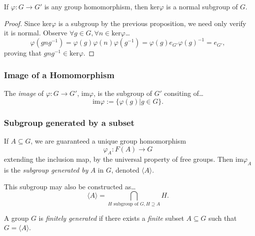 \begin{lemma}
If $\varphi: G \rightarrow G'$ is any group homomorphism, then ker$\varphi$ is a normal subgroup of $G$.
\end{lemma}

\begin{proof}
Since ker$\varphi$ is a subgroup by the previous proposition, we need only verify it is normal. Observe $\forall g \in G, \forall n \in \textrm{ker}\varphi$\dots
$$\varphi(gng^{-1}) = \varphi(g)\varphi(n)\varphi(g^{-1}) = \varphi(g)e_{G'}\varphi(g)^{-1} = e_{G'},$$
proving that $gng^{-1} \in \textrm{ker}\varphi$.
\end{proof}

\subsubsection{Image of a Homomorphism}\label{imagehomomorphism}
The \emph{image} of $\varphi : G \rightarrow G'$, im$\varphi$, is the subgroup of $G'$ consiting of\dots
$$\textrm{im}\varphi := \{ \varphi(g) | g \in G \}.$$

\subsubsection{Subgroup generated by a subset}\label{subgroupgeneratedbysubset}
If $A \subseteq G$, we are guaranteed a unique group homomorphism
$$\varphi_A : F(A) \rightarrow G$$
extending the inclusion map, by the universal property of free groups. Then im$\varphi_A$ is the
\emph{subgroup generated by} $A$ in $G$, denoted $\langle A \rangle$.\newline

\noindent This subgroup may also be constructed as\dots
$$\langle A \rangle = \bigcap_{H \textrm{ subgroup of } G,H \supseteq A} H.$$

\label{finitelygenerated}
A group $G$ is \emph{finitely generated} if there exists a \emph{finite} subset $A \subseteq G$ such that $G = \langle A \rangle$.